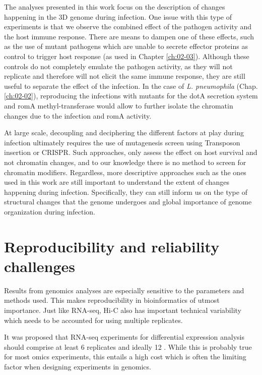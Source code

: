 The analyses presented in this work focus on the description of changes happening in the 3D genome during infection. One issue with this type of experiments is that we observe the combined effect of the pathogen activity and the host immune response. There are means to dampen one of these effects, such as the use of mutant pathogens which are unable to secrete effector proteins as control to trigger host response (as used in Chapter \ref{ch:02-03}). Although these controls do not completely emulate the pathogen activity, as they will not replicate  \cite{vogelConjugativeTransferVirulence1998} and therefore will not elicit the same immune response, they are still useful to separate the effect of the infection. In the case of \textit{L. pneumophila} (Chap. \ref{ch:02-02}), reproducing the infections with mutants for the dotA secretion system and romA methyl-transferase would allow to further isolate the chromatin changes due to the infection and romA activity.

At large scale, decoupling and deciphering the different factors at play during infection ultimately requires the use of mutagenesis screen using Transposon insertion or CRISPR. Such approaches, only assess the effect on host survival and not chromatin changes, and to our knowledge there is no method to screen for chromatin modifiers. Regardless, more descriptive approaches such as the ones used in this work are still important to understand the extent of changes happening during infection. Specifically, they can still inform us on the type of structural changes that the genome undergoes and global importance of genome organization during infection.


\section{Reproducibility and reliability challenges}

Results from genomics analyses are especially sensitive to the parameters and methods used. This makes reproducibility in bioinformatics of utmost importance. Just like RNA-seq, Hi-C also has important technical variability which needs to be accounted for using multiple replicates.

It was proposed that RNA-seq experiments for differential expression analysis should comprise at least 6 replicates and ideally 12 \cite{schurchHowManyBiological2016}. While this is probably true for most omics experiments, this entails a high cost which is often the limiting factor when designing experiments in genomics.


